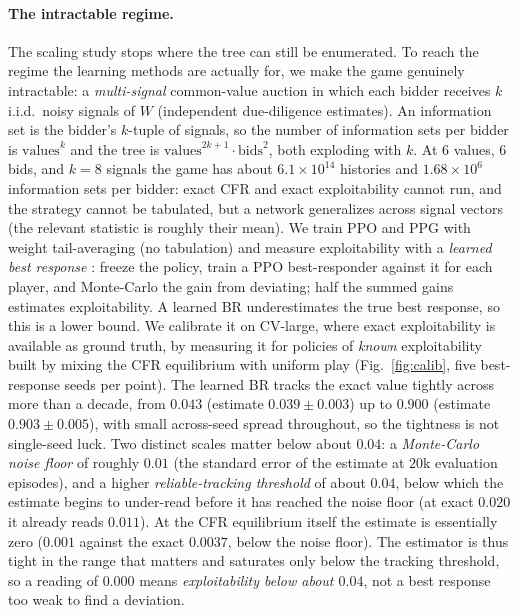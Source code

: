 \documentclass[11pt,a4paper]{article}
\begin{document}
\paragraph{The intractable regime.} The scaling study stops where the tree can still
be enumerated. To reach the regime the learning methods are actually for, we make the
game genuinely intractable: a \emph{multi-signal} common-value auction in which each
bidder receives $k$ i.i.d.\ noisy signals of $W$ (independent due-diligence
estimates). An information set is the bidder's $k$-tuple of signals, so the number of
information sets per bidder is $\text{values}^{k}$ and the tree is
$\text{values}^{2k+1}\cdot\text{bids}^2$, both exploding with $k$. At $6$ values, $6$
bids, and $k=8$ signals the game has about
$6.1\times10^{14}$ histories and $1.68\times10^{6}$ information sets per bidder: exact
CFR and exact exploitability cannot run, and the strategy cannot be tabulated, but a
network generalizes across signal vectors (the relevant statistic is roughly their
mean). We train PPO and PPG with weight tail-averaging (no tabulation) and measure
exploitability with a \emph{learned best response} \citep{lockhart2019, timbers2022}:
freeze the policy, train a PPO best-responder against it for each player, and Monte-Carlo the
gain from deviating;
half the summed gains estimates exploitability. A learned BR underestimates the true
best response, so this is a lower bound. We calibrate it on CV-large, where exact
exploitability is available as ground truth, by measuring it for policies of \emph{known}
exploitability built by mixing the CFR equilibrium with uniform play
(Fig.~\ref{fig:calib}, five best-response seeds per point). The learned BR tracks the
exact value tightly across more than a decade, from $0.043$ (estimate $0.039 \pm 0.003$)
up to $0.900$ (estimate $0.903 \pm 0.005$), with small across-seed spread throughout, so
the tightness is not single-seed luck. Two distinct scales matter below about $0.04$: a
\emph{Monte-Carlo noise floor} of roughly $0.01$ (the standard error of the estimate at
$20$k evaluation episodes), and a higher \emph{reliable-tracking threshold} of about
$0.04$, below which the estimate begins to under-read before it has reached the noise
floor (at exact $0.020$ it already reads $0.011$). At the CFR equilibrium itself the
estimate is essentially zero ($0.001$ against the exact $0.0037$, below the noise floor).
The estimator is thus tight in the range that matters and saturates only below the
tracking threshold, so a reading of $0.000$ means \emph{exploitability below about
$0.04$}, not a best response too weak to find a deviation.
\end{document}
